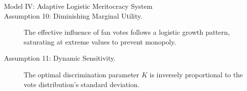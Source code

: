 \begin{description}
    \item[Model IV: Adaptive Logistic Meritocracy System]

    \item[Assumption 10: Diminishing Marginal Utility.] The effective influence of fan votes follows a logistic growth pattern, saturating at extreme values to prevent monopoly.
    \item[Assumption 11: Dynamic Sensitivity.] The optimal discrimination parameter $K$ is inversely proportional to the vote distribution's standard deviation.
\end{description}


